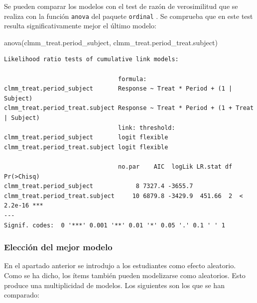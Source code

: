 \documentclass[
  12pt,
  a4paper,
  extrafontsizes,
  onecolumn,
  openright,
  table]{memoir}
\newenvironment{Shaded}{\begin{snugshade}}{\end{snugshade}}
\newcommand{\FunctionTok}[1]{\textcolor[rgb]{0.28,0.35,0.67}{#1}}
\newcommand{\NormalTok}[1]{\textcolor[rgb]{0.00,0.23,0.31}{#1}}
\begin{document}
Se pueden comparar los modelos con el test de razón de verosimilitud que
se realiza con la función \texttt{anova} del paquete \texttt{ordinal}
\autocite[ver][]{ordinalR}. Se comprueba que en este test resulta
significativamente mejor el último modelo:

\scriptsize

\begin{Shaded}
\begin{Highlighting}[]
\FunctionTok{anova}\NormalTok{(clmm\_treat.period\_subject, clmm\_treat.period\_treat.subject)}
\end{Highlighting}
\end{Shaded}

\begin{verbatim}
Likelihood ratio tests of cumulative link models:
 
                                formula:                                         
clmm_treat.period_subject       Response ~ Treat * Period + (1 | Subject)        
clmm_treat.period_treat.subject Response ~ Treat * Period + (1 + Treat | Subject)
                                link: threshold:
clmm_treat.period_subject       logit flexible  
clmm_treat.period_treat.subject logit flexible  

                                no.par    AIC  logLik LR.stat df Pr(>Chisq)    
clmm_treat.period_subject            8 7327.4 -3655.7                          
clmm_treat.period_treat.subject     10 6879.8 -3429.9  451.66  2  < 2.2e-16 ***
---
Signif. codes:  0 '***' 0.001 '**' 0.01 '*' 0.05 '.' 0.1 ' ' 1
\end{verbatim}

\normalsize

\hypertarget{elecciuxf3n-del-mejor-modelo}{%
\subsubsection{Elección del mejor
modelo}\label{elecciuxf3n-del-mejor-modelo}}

En el apartado anterior se introdujo a los estudiantes como efecto
aleatorio. Como se ha dicho, los ítems también pueden modelizarse como
aleatorios. Esto produce una multiplicidad de modelos. Los siguientes
son los que se han comparado:
\end{document}
